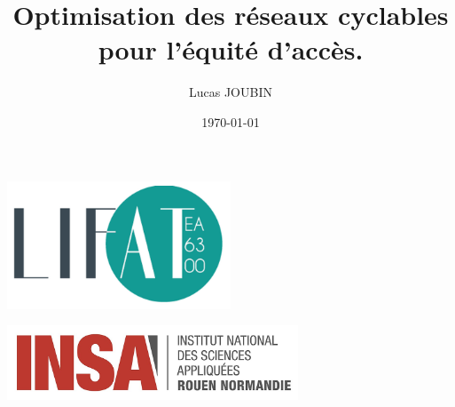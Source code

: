 \title{Optimisation des réseaux cyclables pour l'équité d'accès.}
\author{Lucas JOUBIN}
\date{\today}

\makeatletter
\let\thetitle\@title
\let\theauthor\@author
\let\thedate\@date
\makeatother

\begin{titlepage}
	\begin{minipage}{0.5\textwidth}
		\begin{flushleft} \includegraphics[width=0.5\textwidth]{images/LOGOLIFAT700x400.png}
			\end{flushleft}
			\end{minipage}
			\begin{minipage}{0.5\textwidth}
            
			\begin{flushright} \includegraphics[width=0.65\textwidth]{images/logo_insa.png}
		\end{flushright}
        
	\end{minipage}\\[.5 cm]
	    

\end{titlepage}
